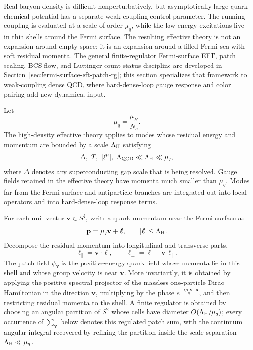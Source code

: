 Real baryon density is difficult nonperturbatively, but asymptotically large
quark chemical potential has a separate weak-coupling control parameter.  The
running coupling is evaluated at a scale of order \(\mu_q\), while the
low-energy excitations live in thin shells around the Fermi surface.  The
resulting effective theory is not an expansion around empty space; it is an
expansion around a filled Fermi sea with soft residual momenta.  The general
finite-regulator Fermi-surface EFT, patch scaling, BCS flow, and
Luttinger-count status discipline are developed in
Section~\ref{sec:fermi-surface-eft-patch-rg}; this section specializes that
framework to weak-coupling dense QCD, where hard-dense-loop gauge response and
color pairing add new dynamical input.

\begin{controlledapproximation}
\label{ca:qcd-hdet-regime}
Let
\[
  \mu_q=\frac{\mu_B}{N_c}.
\]
The high-density effective theory applies to modes whose residual energy and
momentum are bounded by a scale \(\Lambda_{\rm H}\) satisfying
\[
  \Delta,\ T,\ |\ell^\mu|,\ \Lambda_{\rm QCD}
  \ll
  \Lambda_{\rm H}
  \ll
  \mu_q ,
\]
where \(\Delta\) denotes any superconducting gap scale that is being
resolved.  Gauge fields retained in the effective theory have momenta much
smaller than \(\mu_q\).  Modes far from the Fermi surface and antiparticle
branches are integrated out into local operators and into hard-dense-loop
response terms.
\end{controlledapproximation}

\begin{definition}
\label{def:qcd-hdet-patch-decomposition}
For each unit vector \(\mathbf v\in S^2\), write a quark momentum near the
Fermi surface as
\[
  \mathbf p=\mu_q\mathbf v+\boldsymbol\ell,
  \qquad
  |\boldsymbol\ell|\le \Lambda_{\rm H}.
\]
Decompose the residual momentum into longitudinal and transverse parts,
\[
  \ell_\parallel=\mathbf v\cdot\boldsymbol\ell,
  \qquad
  \boldsymbol\ell_\perp
  =
  \boldsymbol\ell-\mathbf v\,\ell_\parallel.
\]
The patch field \(\psi_{\mathbf v}\) is the positive-energy quark field
whose momenta lie in this shell and whose group velocity is near
\(\mathbf v\).  More invariantly, it is obtained by applying the positive
spectral projector of the massless one-particle Dirac Hamiltonian in the
direction \(\mathbf v\), multiplying by the phase
\(e^{-i\mu_q\mathbf v\cdot\mathbf x}\), and then restricting residual
momenta to the shell.  A finite regulator is obtained by choosing an
angular partition of \(S^2\) whose cells have diameter
\(O(\Lambda_{\rm H}/\mu_q)\); every occurrence of \(\sum_{\mathbf v}\)
below denotes this regulated patch sum, with the continuum angular integral
recovered by refining the partition inside the scale separation
\(\Lambda_{\rm H}\ll\mu_q\).
\end{definition}

